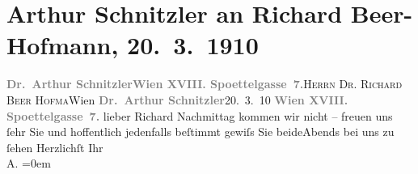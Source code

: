 

         
         \renewcommand{\erwaehntePersonen}{Personen: Richard Beer-Hofmann, Paula Beer-Hofmann}
         \renewcommand{\erwaehnteOrte}{Orte: Edmund-Weiß-Gasse 7, Wien}
         \renewcommand{\erwaehnteWerke}{}
               \section[Arthur Schnitzler an Richard Beer-Hofmann, 20. 3. 1910]{ Arthur Schnitzler an Richard Beer-Hofmann, 20. 3. 1910}\nopagebreak{}\rehead{ }\begin{ledgroupsized}[t]{13cm}\normalsize\beginnumbering{} \toendnotes[C]{\smallbreak\pagebreak[2]} 
\toendnotes[C]{\smallbreak}\pstart{}{\pb}\textcolor{gray}{\textbf{Dr. Arthur Schnitzler}}\pend{}\pstart{}\textcolor{gray}{\textbf{Wien XVIII. Spoettelgasse 7.}}\pend{}{\bigskip}\pstart{}{\pb}\textsc{Herrn Dr. Richard Beer Hofma{\geminationn}}\pend{}\pstart{}Wien\pend{}{\bigskip}\pstart
           \noindent{}{\pb}\textcolor{gray}{\textbf{Dr. Arthur Schnitzler}}\hfill 20. 3. 10\pend
           \pstart
           \textcolor{gray}{\textbf{Wien XVIII. Spoettelgasse 7.}}\pend
           \pstart{}lieber Richard\pend\pstart
           Nachmittag kommen wir nicht – freuen uns ſehr Sie und hoffentlich {\pb}jedenfalls beſtimmt gewiſs Sie beideAbends bei uns zu ſehen\pend
           \pstart
           Herzlichſt Ihr{\\[\baselineskip]}\spacefill\mbox{A.}\pend
           \leftskip=0em{}
         
         \endnumbering{}\end{ledgroupsized}  \newcommand{\dateiname}{L01919}\newcommand{\titel}{Arthur Schnitzler an Richard Beer-Hofmann, 20. 3. 1910}\newcommand{\editorInnen}{Martin Anton Müller und Gerd-Hermann Susen}
      